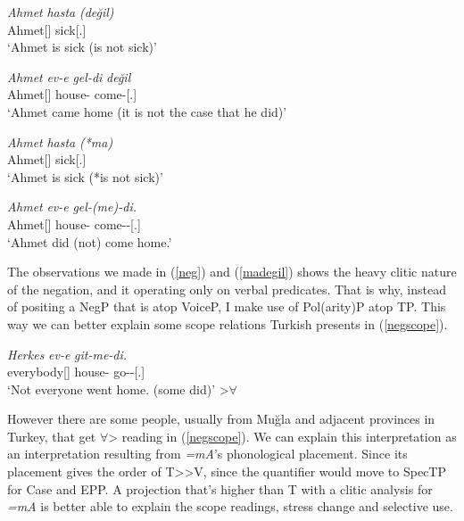 \begin{exe}
    \ex \label{madegil}
    \begin{xlist}
        \ex \gll 
        \textit{Ahmet} \textit{hasta} \textit{(değil)} \\ Ahmet[{\Nom}] sick[{\Third}.{\Sg}] {\Neg} \\
        \glt `Ahmet is sick (is not sick)'
        
        \ex \gll 
        \textit{Ahmet} \textit{ev-e} \textit{gel-di} \textit{değil} \\ Ahmet[{\Nom}] house-{\Dat} come-{\Pst}[{\Third}.{\Sg}] {\Neg} \\
        \glt `Ahmet came home (it is not the case that he did)'
        
        \ex \gll 
        \textit{Ahmet} \textit{hasta} \textit{(*ma)} \\ Ahmet[{\Nom}] sick[{\Third}.{\Sg}] {\Neg} \\
        \glt `Ahmet is sick (*is not sick)'
        
        \ex \gll 
        \textit{Ahmet} \textit{ev-e} \textit{gel-(me)-di.} \\ Ahmet[{\Nom}] house-{\Dat} come-{\Neg}-{\Pst}[{\Third}.{\Sg}] \\
        \glt `Ahmet did (not) come home.'
    \end{xlist}
\end{exe}

The observations we made in (\ref{neg}) and (\ref{madegil}) shows the heavy clitic nature of the negation, and it operating only on verbal predicates. That is why, instead of positing a NegP that is atop VoiceP, I make use of Pol(arity)P atop TP. This way we can better explain some scope relations Turkish presents in (\ref{negscope}).

\begin{exe}
    \ex \label{negscope}
    \begin{xlist}
        \ex \gll 
        \textit{Herkes} \textit{ev-e} \textit{git-me-di.} \\ everybody[{\Nom}] house-{\Dat} go-{\Neg}-{\Pst}[{\Third}.{\Sg}] \\
        \glt `Not everyone went home. (some did)' \hfill {\Neg}\textgreater$\forall$
    \end{xlist}
\end{exe}

However there are some people, usually from Muğla and adjacent provinces in Turkey, that get $\forall$\textgreater {\Neg} reading in (\ref{negscope}). We can explain this interpretation as an interpretation resulting from \textit{=mA}'s phonological placement. Since its placement gives the order of T\textgreater {\Neg}\textgreater V, since the quantifier would move to SpecTP for Case and EPP. A projection that's higher than T with a clitic analysis for \textit{=mA} is better able to explain the scope readings, stress change and selective use. 

